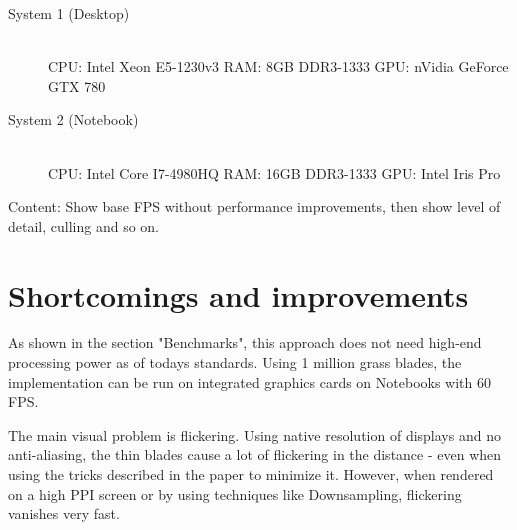 \documentclass[conference]{acmsiggraph}
\begin{document}
\begin{flushleft}
\begin{description}
  \item[System 1 (Desktop)] \hfill \\
  CPU: Intel Xeon E5-1230v3 \linebreak
  RAM: 8GB DDR3-1333 \linebreak
  GPU: nVidia GeForce GTX 780
  \item[System 2 (Notebook)] \hfill \\
  CPU: Intel Core I7-4980HQ \linebreak
  RAM: 16GB DDR3-1333 \linebreak
  GPU: Intel Iris Pro
\end{description}
\end{flushleft}

Content: Show base FPS without performance improvements, then show level of detail, culling and so on.

\section{Shortcomings and improvements}

As shown in the section "Benchmarks", this approach does not need high-end processing power as of todays standards. Using 1 million grass blades, the implementation can be run on integrated graphics cards on Notebooks with 60 FPS.

The main visual problem is flickering. Using native resolution of displays and no anti-aliasing, the thin blades cause a lot of flickering in the distance - even when using the tricks described in the paper to minimize it. However, when rendered on a high PPI screen or by using techniques like Downsampling, flickering vanishes very fast.



\end{document}
